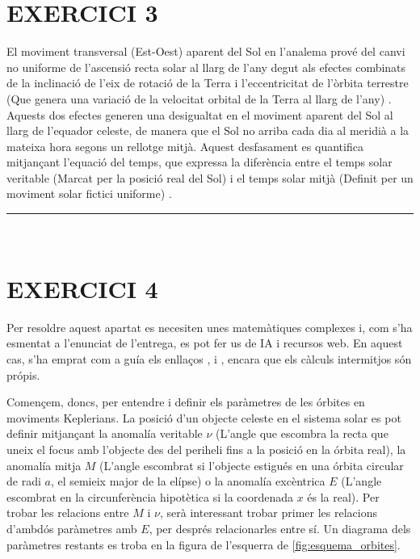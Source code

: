 \documentclass[a4paper, 11pt]{article}
\begin{document}
\section*{EXERCICI 3}
\noindent El moviment transversal (Est-Oest) aparent del Sol en l'analema prové del canvi no uniforme de l'ascensió recta solar al llarg de l'any degut als efectes combinats de la inclinació de l'eix de rotació de la Terra i l'eccentricitat de l'òrbita terrestre (Que genera una variació de la velocitat orbital de la Terra al llarg de l'any) \cite{ANALEMA_WIKI}. Aquests dos efectes generen una desigualtat en el moviment aparent del Sol al llarg de l’equador celeste, de manera que el Sol no arriba cada dia al meridià a la mateixa hora segons un rellotge mitjà. Aquest desfasament es quantifica mitjançant l’equació del temps, que expressa la diferència entre el temps solar veritable (Marcat per la posició real del Sol) i el temps solar mitjà (Definit per un moviment solar fictici uniforme) \cite{EQ_OF_TIME}.
\vspace{10mm}
\hrule\
\vspace{5mm}


\section*{EXERCICI 4}
\noindent Per resoldre aquest apartat es necesiten unes matemàtiques complexes i, com s'ha esmentat a l'enunciat de l'entrega, es pot fer us de IA i recursos web. En aquest cas, s'ha emprat com a guía els enllaços \cite{EQ_OF_CENTER}, \cite{E_ANOMALY} i \cite{M_EQ}, encara que els càlculs intermitjos són própis.

\vspace{2mm}

\noindent Començem, doncs, per entendre i definir els paràmetres de les órbites en moviments Keplerians. La posició d'un objecte celeste en el sistema solar es pot definir mitjançant la anomalía veritable $\nu$ (L'angle que escombra la recta que uneix el focus amb l'objecte des del periheli fins a la posició en la órbita real), la anomalía mitja $M$ (L'angle escombrat si l'objecte estigués en una órbita circular de radi $a$, el semieix major de la elípse) o la anomalía excèntrica $E$ (L'angle escombrat en la circunferència hipotètica si la coordenada $x$ és la real). Per trobar les relacions entre $M$ i $\nu$, serà interessant trobar primer les relacions d'ambdós paràmetres amb $E$, per després relacionarles entre sí. Un diagrama dels paràmetres restants es troba en la figura de l'esquerra de \ref{fig:esquema_orbites}.
\end{document}
